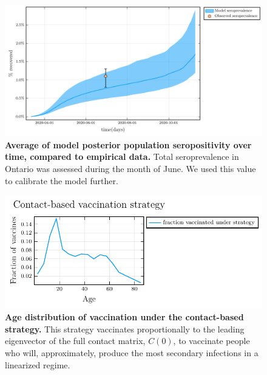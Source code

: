     \begin{figure}[H]
    \centering
    \includegraphics[width = 12 cm]{appendices/FigureS5.pdf}
    \caption[Average of model posterior population seropositivity over time, compared to empirical data.]{\textbf{Average of model posterior population seropositivity over time, compared to empirical data.} Total seroprevalence in Ontario was assessed during the month of June. We used this value to calibrate the model further.  }
    \label{s5}
    \end{figure}
    
    \clearpage 
    
    \begin{figure}[H]
    \centering
    \includegraphics[width = 12 cm]{appendices/FigureS6.pdf}
    \caption[Age distribution of vaccination under the contact-based strategy.]{\textbf{Age distribution of vaccination under the contact-based strategy.} This strategy vaccinates proportionally to the leading eigenvector of the full contact matrix, $C(0)$, to vaccinate people who will, approximately, produce the most secondary infections in a linearized regime.}
    \label{s6}
    \end{figure}
    
    \clearpage 
    
